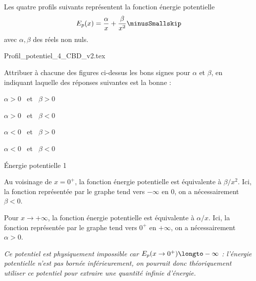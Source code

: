 
\hauteurLargeurCadreReponse		{7mm}{1.5cm}
\initialisationEntrainement

Les quatre profils suivants représentent la fonction énergie potentielle 
\[
E_p(x) = \frac{\alpha}{x}+\frac{\beta}{x^2}\minusSmallskip
\]
avec $\alpha,\beta$ des réels non nuls.


\begin{center}
{Profil_potentiel_4_CBD_v2.tex}
\end{center}


Attribuer à chacune des figures ci-dessus les bons signes pour $\alpha$ et $\beta$, en indiquant laquelle des réponses suivantes est la bonne :
	\begin{listeQCM2Colonnes}
	\item $\alpha>0$ \ {}et \  $\beta>0$
	\item $\alpha>0$ \ {}et \  $ \beta<0$
	\item $\alpha<0$ \ {}et \  $ \beta>0$
	\item $\alpha<0$ \ {}et \  $ \beta<0$
	\end{listeQCM2Colonnes}

\bigskip

\debutEntrainement


\begin{enonce}
	Énergie potentielle \no{}1
\end{enonce}

\reponse{\reponseB{}}

\begin{corrige}
Au voisinage de $x=0^+$, la fonction énergie potentielle est équivalente à $\beta/x^2$. Ici, la fonction représentée par le graphe tend vers $-\infty$ en $0$, on a nécessairement $\beta<0$.

Pour $x\to+\infty$, la fonction énergie potentielle est équivalente à $\alpha/x$. Ici, la fonction représentée par le graphe tend vers $0^+$ en $+\infty$, on a nécessairement $\alpha>0$.

{\itshape Ce potentiel est physiquement impossible car $E_p(x\to 0^+) \longto -\infty$ : l'énergie potentielle n'est pas bornée inférieurement, on pourrait donc théoriquement utiliser ce potentiel pour extraire une quantité infinie d'énergie.}
\end{corrige}

